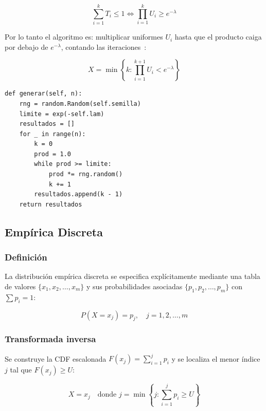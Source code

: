 \documentclass[a4paper, 11pt]{article}
\begin{document}
\begin{equation}
  \sum_{i=1}^k T_i \leq 1 \iff \prod_{i=1}^k U_i \geq e^{-\lambda}
\end{equation}

Por lo tanto el algoritmo es: multiplicar uniformes $U_i$ hasta que el producto
caiga por debajo de $e^{-\lambda}$, contando las iteraciones~\cite{knuth1997art}:

\begin{equation}
  X = \min\left\{k : \prod_{i=1}^{k+1} U_i < e^{-\lambda}\right\}
  \label{eq:poisson_inv}
\end{equation}

\begin{lstlisting}[style=python, caption={Generador Poisson — transformada inversa por producto de uniformes.}]
def generar(self, n):
    rng = random.Random(self.semilla)
    limite = exp(-self.lam)
    resultados = []
    for _ in range(n):
        k = 0
        prod = 1.0
        while prod >= limite:
            prod *= rng.random()
            k += 1
        resultados.append(k - 1)
    return resultados
\end{lstlisting}


\subsection{Empírica Discreta}

\subsubsection*{Definición}

La distribución empírica discreta se especifica explícitamente mediante una tabla
de valores $\{x_1, x_2, \ldots, x_m\}$ y sus probabilidades asociadas
$\{p_1, p_2, \ldots, p_m\}$ con $\sum p_i = 1$:

\begin{equation}
  P(X = x_j) = p_j, \quad j = 1,2,\ldots,m
\end{equation}

\subsubsection*{Transformada inversa}

Se construye la CDF escalonada $F(x_j) = \sum_{i=1}^{j} p_i$ y se localiza
el menor índice $j$ tal que $F(x_j) \geq U$:

\begin{equation}
  X = x_j \quad \text{donde } j = \min\left\{j : \sum_{i=1}^{j} p_i \geq U\right\}
  \label{eq:emp_inv}
\end{equation}
\end{document}
